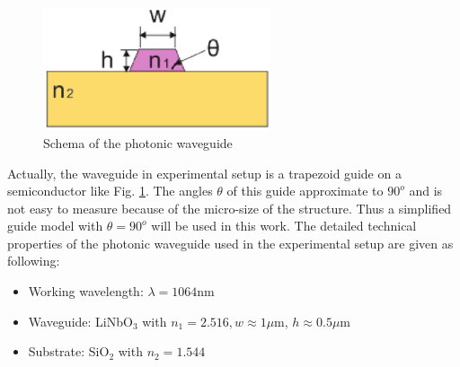 \begin{figure}[!ht]
\centering
\includegraphics[width=0.6\textwidth]{bilder/orignial_waveguide}
\caption{Schema of the photonic waveguide}
\label{fig:photonic_waveguide}
\end{figure}
Actually, the waveguide in experimental setup is a trapezoid guide on a semiconductor like Fig. \ref{fig:photonic_waveguide}. The angles $\theta$ of this guide approximate to $90^{o}$ and is not easy to measure because of the micro-size of the structure. Thus a simplified guide model with $\theta=90^{o}$ will be used in this work. The detailed technical properties of the photonic waveguide used in the experimental setup are given as following:
\begin{itemize}
\item Working wavelength: $\lambda=1064$nm
\item Waveguide: LiNbO$_{3}$ with $n_{1}=2.516, w\approx 1\mu$m, $h\approx 0.5 \mu$m
\item Substrate: SiO$_{2}$ with $n_{2}=1.544 $
\end{itemize}

